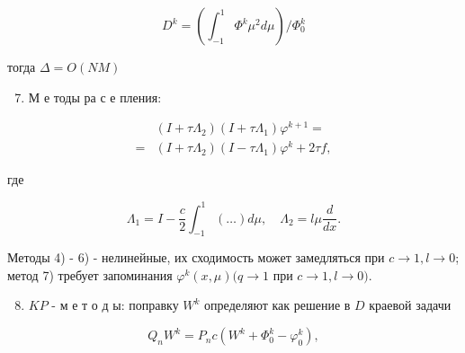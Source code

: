 \documentclass[10pt]{article}
\begin{document}
\[

D^{k}=\left(\int_{-1}^{1} \Phi^{k} \mu^{2} d \mu\right) / \Phi_{0}^{k}

\]



тогда $\Delta=O(N M)$



\begin{enumerate}

  \setcounter{enumi}{6}

  \item М е тоды ра с е пления:

\end{enumerate}



\[

\begin{aligned}

& \left(I+\tau \Lambda_{2}\right)\left(I+\tau \Lambda_{1}\right) \varphi^{k+1}= \\

= & \left(I+\tau \Lambda_{2}\right)\left(I-\tau \Lambda_{1}\right) \varphi^{k}+2 \tau f,

\end{aligned}

\]



где



\[

\Lambda_{1}=I-\frac{c}{2} \int_{-1}^{1}(\ldots) d \mu, \quad \Lambda_{2}=l \mu \frac{d}{d x} .

\]



Методы 4) - 6) - нелинейные, их сходимость может замедляться при $c \rightarrow 1, l \rightarrow 0$; метод 7) требует запоминания $\varphi^{k}(x, \mu)(q \rightarrow 1$ при $c \rightarrow 1, l \rightarrow 0)$.



\begin{enumerate}

  \setcounter{enumi}{7}

  \item $K P$ - м е т о д ы: поправку $W^{k}$ определяют как решение в $D$ краевой задачи

\end{enumerate}



\[

Q_{n} W^{k}=P_{n} c\left(W^{k}+\Phi_{0}^{k}-\varphi_{0}^{k}\right),

\]
\end{document}
